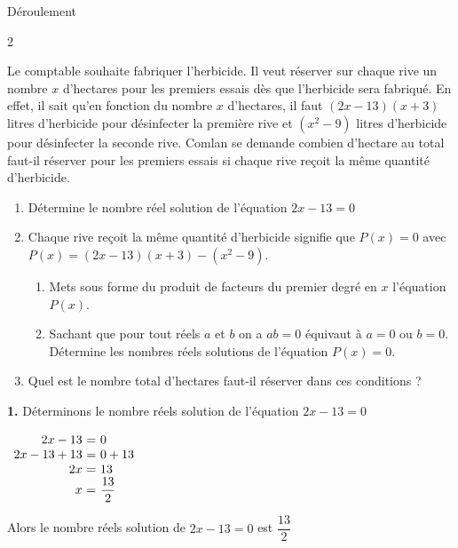   \newpage
  \begin{center}
  	Déroulement
  \end{center}
  \begin{multicols*}{2}
  	
  	Le comptable souhaite fabriquer l'herbicide. Il veut réserver sur chaque rive un nombre $x$ d'hectares pour les premiers essais dès que l'herbicide sera fabriqué. En effet, il sait qu'en fonction du nombre $x$ d'hectares, il faut $(2x-13)(x+3)$ litres d'herbicide pour désinfecter la première rive et $\left(x^2-9\right)$ litres d'herbicide pour désinfecter la seconde rive. Comlan se demande combien d'hectare au total faut-il réserver pour les premiers essais si chaque rive reçoit la même quantité d'herbicide.
  	
  	
  	\begin{enumerate}
  		\item  Détermine le nombre réel solution de l'équation $2x-13=0$
  		\item Chaque rive reçoit la même quantité d'herbicide signifie que $P(x)=0$ avec $ P(x)=(2x-13)(x+3)-\left(x^2-9\right)$.
  		\begin{enumerate}
  			\item Mets sous forme du produit de facteurs du premier degré en $x$ l'équation $P(x)$.
  			\item Sachant que pour tout réels $a$ et $b$ on a $ab=0$ équivaut à $a=0$ ou $b=0$. Détermine les nombres réels solutions de l'équation $P(x)=0$.
  		\end{enumerate}
  		\item Quel est le nombre total d'hectares faut-il réserver dans ces conditions ?
  	\end{enumerate} 
  	
  	\dure
  	\resul
  	\textbf{1.} Déterminons le nombre réels solution de l'équation $2x-13=0$
  	
  	$\begin{array}{r@{\ =\ }l} 
  		2x-13&0\\
  		2x-13+13	&0+13\\
  		2x	&13\\	
  		x	&\dfrac{13}{2}\\
  	\end{array}$
  	
  	Alors le nombre 
  	réels solution de  $2x-13=0$ est $\dfrac{13}{2}$ 
  	

\end{multicols*}
